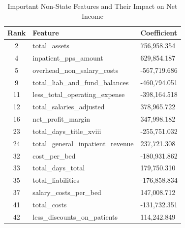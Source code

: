 \documentclass{article}
\theoremstyle{mytheoremstyle}
\theoremstyle{mytheoremstyle}
\theoremstyle{myproblemstyle}
\begin{document}
\begin{table}[ht]
\centering
\caption{Important Non-State Features and Their Impact on Net Income}
\begin{tabular}{@{}cll@{}}
\toprule
Rank & Feature & Coefficient \\
\midrule
2 & total\_assets & 756,958.354 \\
4 & inpatient\_pps\_amount & 629,854.187 \\
5 & overhead\_non\_salary\_costs & -567,719.686 \\
9 & total\_liab\_and\_fund\_balances & -460,794.051 \\
11 & less\_total\_operating\_expense & -398,164.518 \\
12 & total\_salaries\_adjusted & 378,965.722 \\
16 & net\_profit\_margin & 347,998.182 \\
23 & total\_days\_title\_xviii & -255,751.032 \\
24 & total\_general\_inpatient\_revenue & 237,721.308 \\
32 & cost\_per\_bed & -180,931.862 \\
33 & total\_days\_total & 179,750.310 \\
35 & total\_liabilities & -176,858.834 \\
37 & salary\_costs\_per\_bed & 147,008.712 \\
41 & total\_costs & -131,732.351 \\
42 & less\_discounts\_on\_patients & 114,242.849 \\
\bottomrule
\end{tabular}
\label{tab:non_state_important_features}
\end{table}
\pagebreak
\end{document}
